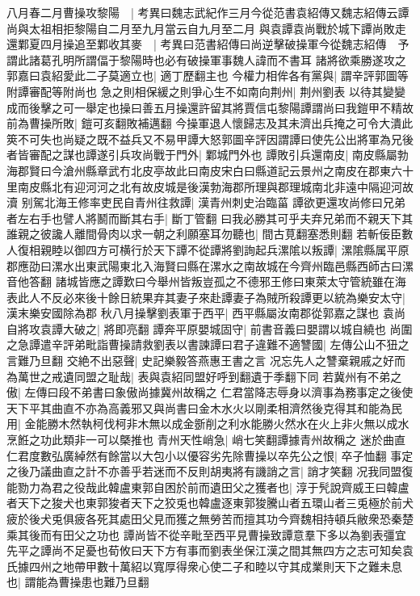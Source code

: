 八月春二月曹操攻黎陽　|{
	考異曰魏志武紀作三月今從范書袁紹傳又魏志紹傳云譚尚與太祖相拒黎陽自二月至九月當云自九月至二月}
與袁譚袁尚戰於城下譚尚敗走還鄴夏四月操追至鄴收其麥　|{
	考異曰范書紹傳曰尚逆擊破操軍今從魏志紹傳　予謂此諸葛孔明所謂偪于黎陽時也必有破操軍事魏人諱而不書耳}
諸將欲乘勝遂攻之郭嘉曰袁紹愛此二子莫適立也|{
	適丁歷翻主也}
今權力相侔各有黨與|{
	謂辛評郭圖等附譚審配等附尚也}
急之則相保緩之則爭心生不如南向荆州|{
	荆州劉表}
以待其變變成而後擊之可一舉定也操曰善五月操還許留其將賈信屯黎陽譚謂尚曰我鎧甲不精故前為曹操所敗|{
	鎧可亥翻敗補邁翻}
今操軍退人懷歸志及其未濟出兵掩之可令大潰此筴不可失也尚疑之既不益兵又不易甲譚大怒郭圖辛評因謂譚曰使先公出將軍為兄後者皆審配之謀也譚遂引兵攻尚戰于門外|{
	鄴城門外也}
譚敗引兵還南皮|{
	南皮縣屬勃海郡賢曰今滄州縣章武冇北皮亭故此曰南皮宋白曰縣道記云景州之南皮在郡東六十里南皮縣北有迎河河之北有故皮城是後漢勃海郡所理與郡理城南北非遠中隔迎河故瀆}
别駕北海王修率吏民自青州往救譚|{
	漢青州刺史治臨菑}
譚欲更還攻尚修曰兄弟者左右手也譬人將鬭而斷其右手|{
	斷丁管翻}
曰我必勝其可乎夫弃兄弟而不親天下其誰親之彼讒人離間骨肉以求一朝之利願塞耳勿聽也|{
	間古莧翻塞悉則翻}
若斬佞臣數人復相親睦以御四方可横行於天下譚不從譚將劉詢起兵漯隂以叛譚|{
	漯隂縣属平原郡應劭曰漯水出東武陽東北入海賢曰縣在漯水之南故城在今齊州臨邑縣西師古曰漯音他答翻}
諸城皆應之譚歎曰今舉州皆叛豈孤之不德邪王修曰東萊太守管統雖在海表此人不反必來後十餘日統果弃其妻子來赴譚妻子為賊所殺譚更以統為樂安太守|{
	漢末樂安國除為郡}
秋八月操擊劉表軍于西平|{
	西平縣屬汝南郡從郭嘉之謀也}
袁尚自將攻袁譚大破之|{
	將即亮翻}
譚奔平原嬰城固守|{
	前書音義曰嬰謂以城自繞也}
尚圍之急譚遣辛評弟毗詣曹操請救劉表以書諫譚曰君子違難不適讐國|{
	左傳公山不狃之言難乃旦翻}
交絶不出惡聲|{
	史記樂毅答燕惠王書之言}
况忘先人之讐棄親戚之好而為萬世之戒遺同盟之耻哉|{
	表與袁紹同盟好呼到翻遺于季翻下同}
若冀州有不弟之傲|{
	左傳曰段不弟書曰象傲尚據冀州故稱之}
仁君當降志辱身以濟事為務事定之後使天下平其曲直不亦為高義邪又與尚書曰金木水火以剛柔相濟然後克得其和能為民用|{
	金能勝木然執柯伐柯非木無以成金斵削之利水能勝火然水在火上非火無以成水烹餁之功此類非一可以槩推也}
青州天性峭急|{
	峭七笑翻譚據青州故稱之}
迷於曲直仁君度數弘廣綽然有餘當以大包小以優容劣先除曹操以卒先公之恨|{
	卒子恤翻}
事定之後乃議曲直之計不亦善乎若迷而不反則胡夷將有譏誚之言|{
	誚才笑翻}
况我同盟復能勠力為君之役哉此韓盧東郭自困於前而遺田父之獲者也|{
	淳于髠說齊威王曰韓盧者天下之狻犬也東郭狻者天下之狡兎也韓盧逐東郭狻騰山者五環山者三兎極於前犬疲於後犬兎俱疲各死其處田父見而獲之無勞苦而擅其功今齊魏相持頓兵敝衆恐秦楚乘其後而有田父之功也}
譚尚皆不從辛毗至西平見曹操致譚意羣下多以為劉表彊宜先平之譚尚不足憂也荀攸曰天下方有事而劉表坐保江漢之間其無四方之志可知矣袁氏據四州之地帶甲數十萬紹以寬厚得衆心使二子和睦以守其成業則天下之難未息也|{
	謂能為曹操患也難乃旦翻}
